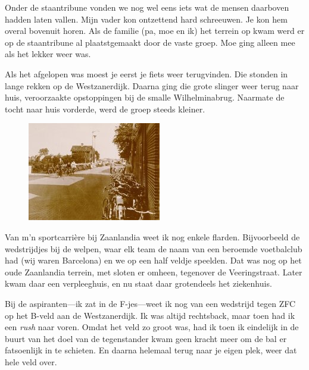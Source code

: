 \documentclass[12pt,twoside]{memoir}
\begin{document}
Onder de staantribune vonden we nog wel eens iets wat de mensen daarboven hadden laten vallen. Mijn vader kon ontzettend hard schreeuwen. Je kon hem overal bovenuit horen. Als de familie (pa, moe en ik) het terrein op kwam werd er op de staantribune al plaatstgemaakt door de vaste groep. Moe ging alleen mee als het lekker weer was. 

Als het afgelopen was moest je eerst je fiets weer terugvinden. Die stonden in lange rekken op de Westzanerdijk. Daarna ging die grote slinger weer terug naar huis, veroorzaakte opstoppingen bij de smalle Wilhelminabrug. Naarmate de tocht naar huis vorderde, werd de groep steeds kleiner. 

\begin{figure}
\includegraphics[width=\textwidth]{img/ch11/zfc}
\end{figure}

Van m’n sportcarrière bij Zaanlandia weet ik nog enkele flarden. Bijvoorbeeld de wedstrijdjes bij de welpen, waar elk team de naam van een beroemde voetbalclub had (wij waren Barcelona) en we op een half veldje speelden. Dat was nog op het oude Zaanlandia terrein, met sloten er omheen, tegenover de Veeringstraat. Later kwam daar een verpleeghuis, en nu staat daar grotendeels het ziekenhuis.

Bij de aspiranten---ik zat in de F-jes---weet ik nog van een wedstrijd tegen ZFC op het B-veld aan de Westzanerdijk. Ik was altijd rechtsback, maar toen had ik een \emph{rush} naar voren. Omdat het veld zo groot was, had ik toen ik eindelijk in de buurt van het doel van de tegenstander kwam geen kracht meer om de bal er fatsoenlijk in te schieten. En daarna helemaal terug naar je eigen plek, weer dat hele veld over. 
\end{document}
